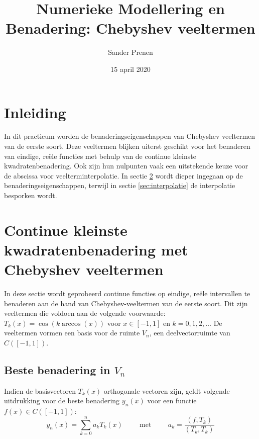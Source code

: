 \documentclass[a4paper, 12pt, titlepage, fleqn]{article}
\begin{document}
\title{\textbf{Numerieke Modellering en Benadering: Chebyshev veeltermen}}
\author{Sander Prenen}

\date{15 april 2020}
\begin{titlepage}
	\maketitle
	\thispagestyle{empty}
\end{titlepage}

\newpage
\tableofcontents
\newpage
\section{Inleiding}
In dit practicum worden de benaderingseigenschappen van Chebyshev veeltermen van de eerste soort. Deze veeltermen blijken uiterst geschikt voor het benaderen van eindige, re\"ele functies met behulp van de continue kleinste kwadratenbenadering. Ook zijn hun nulpunten vaak een uitstekende keuze voor de abscissa voor veelterminterpolatie. In sectie \ref{sec:benadering} wordt dieper ingegaan op de benaderingseigenschappen, terwijl in sectie \ref{sec:interpolatie} de interpolatie besporken wordt.

\section{Continue kleinste kwadratenbenadering met Chebyshev veeltermen}
\label{sec:benadering}
In deze sectie wordt geprobeerd continue functies op eindige, re\"ele intervallen te benaderen aan de hand van Chebyshev-veeltermen van de eerste soort. Dit zijn veeltermen die voldoen aan de volgende voorwaarde: $T_k(x) = \cos(k \arccos (x))$ voor $x \in [-1,1]$ en $k = 0,1,2,\ldots$ De veeltermen vormen een basis voor de ruimte $V_n$, een deelvectorruimte van $C([-1,1])$. 


\subsection{Beste benadering in $V_n$}
Indien de basisvectoren $T_k(x)$ orthogonale vectoren zijn, geldt volgende uitdrukking voor de beste benadering $y_n(x)$ voor een functie $f(x) \in C([-1,1])$:
\begin{equation}
y_n(x) = \sum_{k=0}^na_kT_k(x) \hspace{1cm} \text{met} \hspace{1cm} a_k = \frac{(f,T_k)}{(T_k,T_k)}
\label{eq:beste_benadering}
\end{equation}
\end{document}
